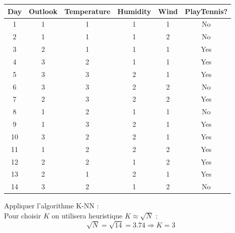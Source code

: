 \documentclass{article}
\begin{document}
\begin{table}[h]
\centering

\renewcommand{\arraystretch}{1.25} 
\setlength{\tabcolsep}{12pt}      

\begin{tabular}{|c|c|c|c|c|c|} 

\hline
\textbf{Day}  & \textbf{Outlook}  & \textbf{Temperature} & \textbf{Humidity} & \textbf{Wind} & \textbf{PlayTennis?} \\ \hline
1& 1 & 1& 1 & 1 & No \\ \hline
2& 1 &1 &1 &2& No \\ \hline
3 &2 &1 &1 &1 &Yes \\ \hline
4 &3 &2 &1 &1 &Yes \\ \hline
5 &3 &3 &2 &1 &Yes \\ \hline
6 &3 &3 &2 &2 &No \\ \hline
7 &2 &3 &2 &2 &Yes \\ \hline
8 &1 &2 &1 &1 &No \\ \hline
9 &1 &3 &2 &1 &Yes \\ \hline
10 &3 &2 &2 &1 &Yes \\ \hline
11 &1 &2 &2 &2 &Yes\\ \hline
12 &2 &2 &1 &2 &Yes \\ \hline
13 &2 & 1& 2 &1& Yes\\ \hline
14 &3 &2 &1& 2& No \\ \hline
\end{tabular}
\end{table}

Appliquer l’algorithme K-NN :\\[0.1cm]
Pour choisir \(K\) on utilisera heuristique \(K \approx \sqrt{N}\) :
\[ \sqrt{N} = \sqrt{14}  = 3.74 \Rightarrow K = 3\]
\end{document}
